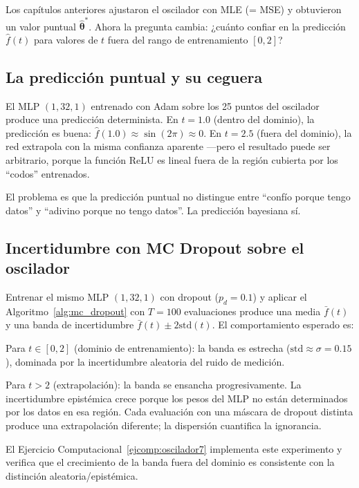 
Los capítulos anteriores ajustaron el oscilador con MLE (= MSE) y
obtuvieron un valor puntual $\hat{\bm{\theta}}^*$. Ahora la pregunta
cambia: ¿cuánto confiar en la predicción $\hat{f}(t)$ para valores de $t$
fuera del rango de entrenamiento $[0, 2]$?

\subsection{La predicción puntual y su ceguera}
\label{subsec:osc_puntual}

El MLP $(1, 32, 1)$ entrenado con Adam sobre los 25 puntos del oscilador
produce una predicción determinista. En $t = 1.0$ (dentro del dominio), la
predicción es buena: $\hat{f}(1.0) \approx \sin(2\pi) \approx 0$. En
$t = 2.5$ (fuera del dominio), la red extrapola con la misma confianza
aparente —pero el resultado puede ser arbitrario, porque la función ReLU
es lineal fuera de la región cubierta por los ``codos'' entrenados.

El problema es que la predicción puntual no distingue entre ``confío
porque tengo datos'' y ``adivino porque no tengo datos''. La predicción
bayesiana sí.

\subsection{Incertidumbre con MC Dropout sobre el oscilador}
\label{subsec:osc_dropout}

Entrenar el mismo MLP $(1, 32, 1)$ con dropout ($p_d = 0.1$) y aplicar el
Algoritmo~\ref{alg:mc_dropout} con $T = 100$ evaluaciones produce una
media $\bar{f}(t)$ y una banda de incertidumbre
$\bar{f}(t) \pm 2\text{std}(t)$. El comportamiento esperado es:

Para $t \in [0, 2]$ (dominio de entrenamiento): la banda es estrecha
($\text{std} \approx \sigma = 0.15$), dominada por la incertidumbre
aleatoria del ruido de medición.

Para $t > 2$ (extrapolación): la banda se ensancha progresivamente. La
incertidumbre epistémica crece porque los pesos del MLP no están
determinados por los datos en esa región. Cada evaluación con una máscara
de dropout distinta produce una extrapolación diferente; la dispersión
cuantifica la ignorancia.

El Ejercicio Computacional~\ref{ejcomp:oscilador7} implementa este
experimento y verifica que el crecimiento de la banda fuera del dominio es
consistente con la distinción aleatoria/epistémica.


